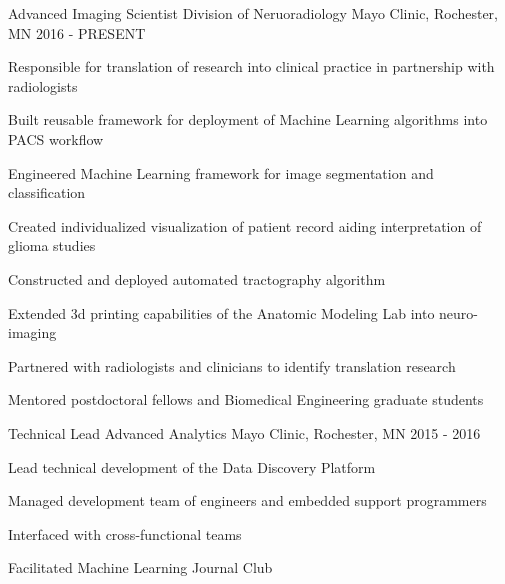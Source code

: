 

\begin{cventries}
  \cventry
      {Advanced Imaging Scientist} %
      {Division of Neruoradiology} %
      {Mayo Clinic, Rochester, MN} %
      {2016 - PRESENT} %
      {
        \begin{cvitems}
        \item Responsible for translation of research into clinical practice in partnership with radiologists
        \item Built reusable framework for deployment of Machine Learning algorithms into PACS workflow
        \item Engineered Machine Learning framework for image segmentation and classification
        \item Created individualized visualization of patient record aiding interpretation of glioma studies
        \item Constructed and deployed automated tractography algorithm
        \item Extended 3d printing capabilities of the Anatomic Modeling Lab into neuro-imaging
        \item Partnered with radiologists and clinicians to identify translation research
        \item Mentored postdoctoral fellows and Biomedical Engineering graduate students
        \end{cvitems}
      }
      
  \cventry
      {Technical Lead} %
      {Advanced Analytics} %
      {Mayo Clinic, Rochester, MN} %
      {2015 - 2016} %
      { 
        \begin{cvitems}
        \item{Lead technical development of the Data Discovery Platform}
        \item{Managed development team of engineers and embedded support programmers}
        \item{Interfaced with cross-functional teams}
        \item{Facilitated Machine Learning Journal Club}
        \end{cvitems}
      }
      

\end{cventries}
